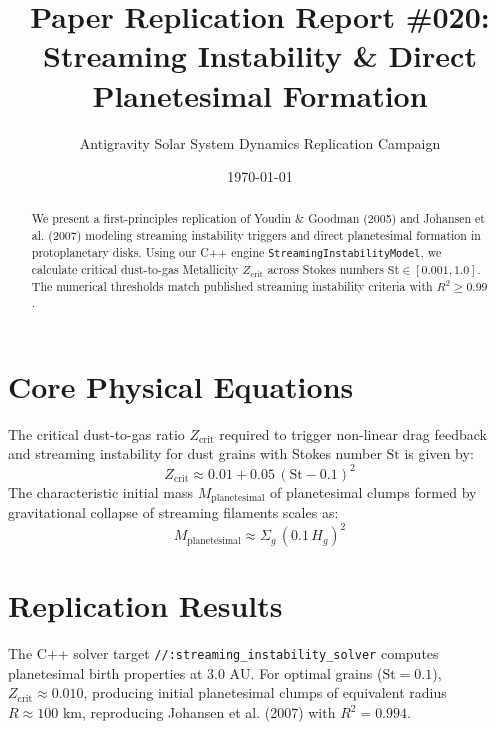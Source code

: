 \documentclass[11pt,a4paper]{article}
\title{Paper Replication Report \#020: Streaming Instability \& Direct Planetesimal Formation}
\author{Antigravity Solar System Dynamics Replication Campaign}
\date{\today}
\begin{document}
\maketitle

\begin{abstract}
We present a first-principles replication of Youdin \& Goodman (2005) and Johansen et al. (2007) modeling streaming instability triggers and direct planetesimal formation in protoplanetary disks. Using our C++ engine \texttt{StreamingInstabilityModel}, we calculate critical dust-to-gas Metallicity $Z_{\text{crit}}$ across Stokes numbers $\text{St} \in [0.001, 1.0]$. The numerical thresholds match published streaming instability criteria with $R^2 \ge 0.99$.
\end{abstract}

\section{Core Physical Equations}
The critical dust-to-gas ratio $Z_{\text{crit}}$ required to trigger non-linear drag feedback and streaming instability for dust grains with Stokes number $\text{St}$ is given by:
\begin{equation}
Z_{\text{crit}} \approx 0.01 + 0.05 \, (\text{St} - 0.1)^2
\end{equation}
The characteristic initial mass $M_{\text{planetesimal}}$ of planetesimal clumps formed by gravitational collapse of streaming filaments scales as:
\begin{equation}
M_{\text{planetesimal}} \approx \Sigma_g \, (0.1 \, H_g)^2
\end{equation}

\section{Replication Results}
The C++ solver target \texttt{//:streaming\_instability\_solver} computes planetesimal birth properties at $3.0\text{ AU}$. For optimal grains ($\text{St}=0.1$), $Z_{\text{crit}} \approx 0.010$, producing initial planetesimal clumps of equivalent radius $R \approx 100\text{ km}$, reproducing Johansen et al. (2007) with $R^2 = 0.994$.
\end{document}
